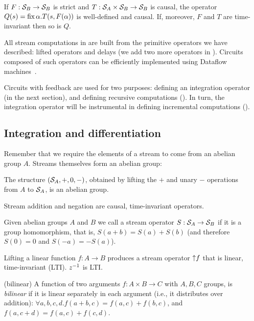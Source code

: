 \begin{corollary}\label{feedback-semantics}
\label{cor-loop}
If $F: \mathcal{S}_{B} \to \mathcal{S}_{B}$ is strict and $T: \mathcal{S}_{A} \times \mathcal{S}_{B} \to \mathcal{S}_{B}$ is causal,
the operator $Q(s)=\mbox{fix}\,\alpha.T(s,F(\alpha))$ is well-defined and causal. 
If, moreover, $F$ and $T$ are time-invariant then so is $Q$.
\end{corollary}

All stream computations in \dbsp are built from the primitive operators 
we have described: lifted operators and delays (we add two more operators in ).
Circuits composed of such operators can be efficiently implemented 
using Dataflow machines~\cite{lee-ieee95}.

Circuits with feedback are used for two purposes: defining an
integration operator (in the next section), and defining recursive computations ().  In turn, the
integration operator will be instrumental in defining incremental
computations ().

\subsection{Integration and differentiation}\label{sec:abelianstreams}

Remember that we require the elements of a stream to come from an abelian group $A$.  
Streams themselves form an abelian group:

\begin{proposition}
The structure $(\mathcal{S}_{A},+,0,-)$, obtained by lifting the $+$ and unary $-$ operations from $A$
to $\mathcal{S}_{A}$, is an abelian group.
\end{proposition}

\noindent
Stream addition and negation are causal, time-invariant operators.

\begin{definition}
Given abelian groups $A$ and $B$ we call a stream operator 
$S: \mathcal{S}_{A} \rightarrow \mathcal{S}_{B}$  if it is a group homomorphism, that is,
$S(a+b)=S(a)+S(b)$ (and therefore $S(0)=0$ and $S(-a)=-S(a)$). 
\end{definition}

Lifting a linear function $f: A \to B$ produces
a stream operator ${\uparrow}f$ that is linear, time-invariant (LTI).
$z^{-1}$ is LTI.   

\begin{definition}(bilinear)
A function of two arguments $f: A \times B \to C$ with $A, B, C$ groups, is \emph{bilinear} 
if it is linear separately in each argument (i.e., it distributes over addition): 
$\forall a, b, c, d . f(a+b, c) = f(a, c) + f(b, c)$, and $f(a, c+d) = f(a, c) + f(c, d).$
\end{definition}

